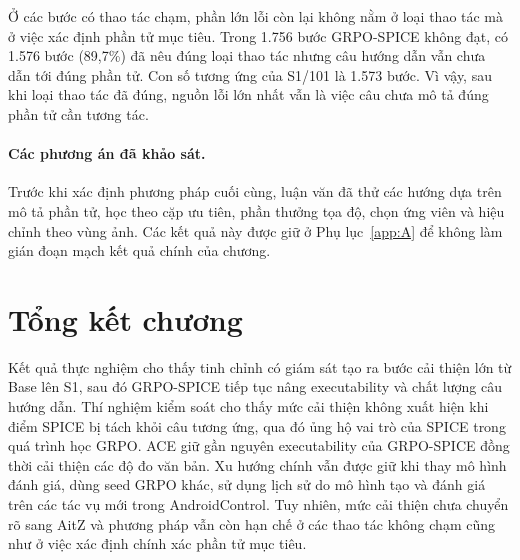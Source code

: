Ở các bước có thao tác chạm, phần lớn lỗi còn lại không nằm ở loại thao tác mà ở việc xác định phần tử mục tiêu. Trong 1.756 bước GRPO-SPICE không đạt, có 1.576 bước (89,7\%) đã nêu đúng loại thao tác nhưng câu hướng dẫn vẫn chưa dẫn tới đúng phần tử. Con số tương ứng của S1/101 là 1.573 bước. Vì vậy, sau khi loại thao tác đã đúng, nguồn lỗi lớn nhất vẫn là việc câu chưa mô tả đúng phần tử cần tương tác.

\paragraph{Các phương án đã khảo sát.}\label{sec:6.10} Trước khi xác định phương pháp cuối cùng, luận văn đã thử các hướng dựa trên mô tả phần tử, học theo cặp ưu tiên, phần thưởng tọa độ, chọn ứng viên và hiệu chỉnh theo vùng ảnh. Các kết quả này được giữ ở Phụ lục~\ref{app:A} để không làm gián đoạn mạch kết quả chính của chương.

\section{Tổng kết chương}

Kết quả thực nghiệm cho thấy tinh chỉnh có giám sát tạo ra bước cải thiện lớn từ Base lên S1, sau đó GRPO-SPICE tiếp tục nâng executability và chất lượng câu hướng dẫn. Thí nghiệm kiểm soát cho thấy mức cải thiện không xuất hiện khi điểm SPICE bị tách khỏi câu tương ứng, qua đó ủng hộ vai trò của SPICE trong quá trình học GRPO. ACE giữ gần nguyên executability của GRPO-SPICE đồng thời cải thiện các độ đo văn bản. Xu hướng chính vẫn được giữ khi thay mô hình đánh giá, dùng seed GRPO khác, sử dụng lịch sử do mô hình tạo và đánh giá trên các tác vụ mới trong AndroidControl. Tuy nhiên, mức cải thiện chưa chuyển rõ sang AitZ và phương pháp vẫn còn hạn chế ở các thao tác không chạm cũng như ở việc xác định chính xác phần tử mục tiêu.

